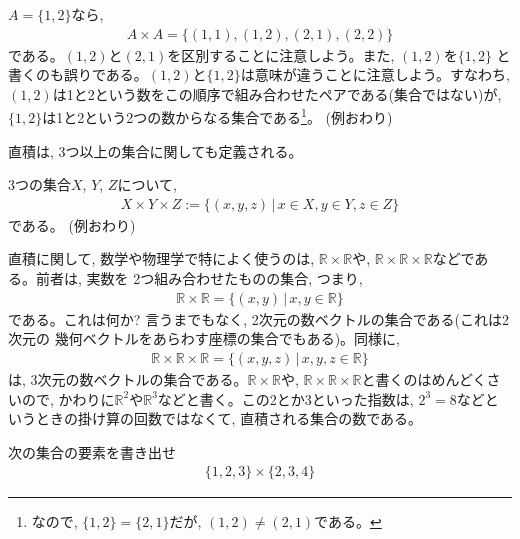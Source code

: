 \begin{exmpl}$A=\{1, 2\}$なら, 
\begin{eqnarray}
A \times A=\{(1, 1), (1, 2), (2, 1), (2, 2)\}
\end{eqnarray}
である。$(1, 2)$と$(2, 1)$を区別することに注意しよう。また, $(1, 2)$を$\{1, 2\}$
と書くのも誤りである。$(1, 2)$と$\{1, 2\}$は意味が違うことに注意しよう。すなわち, 
$(1, 2)$は1と2という数をこの順序で組み合わせたペアである(集合ではない)が, 
$\{1, 2\}$は1と2という2つの数からなる集合である\footnote{なので, 
$\{1, 2\}=\{2, 1\}$だが, $(1, 2)\neq(2, 1)$である。}。
(例おわり)\end{exmpl}
\mv

直積は, 3つ以上の集合に関しても定義される。

\begin{exmpl}3つの集合$X$, $Y$, $Z$について, 
\begin{eqnarray*}
X\times Y\times Z:=\{(x, y, z)\,|\,x\in X, y\in Y, z\in Z\}
\end{eqnarray*}
である。
(例おわり)\end{exmpl}
\mv

直積に関して, 数学や物理学で特によく使うのは, $\mathbb{R} \times \mathbb{R}$や, 
$\mathbb{R} \times \mathbb{R} \times \mathbb{R}$などである。前者は, 実数を
2つ組み合わせたものの集合, つまり, 
\begin{eqnarray}
\mathbb{R} \times \mathbb{R}=\{(x, y)\,|\,x, y \in \mathbb{R}\}
\end{eqnarray}
である。これは何か? 言うまでもなく, 2次元の数ベクトルの集合である(これは2次元の
幾何ベクトルをあらわす座標の集合でもある)。同様に, 
\begin{eqnarray}
\mathbb{R} \times \mathbb{R}\times \mathbb{R}=\{(x, y, z)\,|\,x, y, z \in \mathbb{R}\}
\end{eqnarray}
は, 3次元の数ベクトルの集合である。$\mathbb{R} \times \mathbb{R}$や, 
$\mathbb{R} \times \mathbb{R} \times \mathbb{R}$と書くのはめんどくさいので, 
かわりに$\mathbb{R}^2$や$\mathbb{R}^3$などと書く。この2とか3といった指数は, 
$2^3=8$などというときの掛け算の回数ではなくて, 直積される集合の数である。\\

\begin{q}\label{q:logic_group_elem1}
次の集合の要素を書き出せ
\begin{eqnarray}\{1, 2, 3\}\times\{2, 3, 4\}\label{eq_prob_group_product}\end{eqnarray}
\end{q}
\mv


